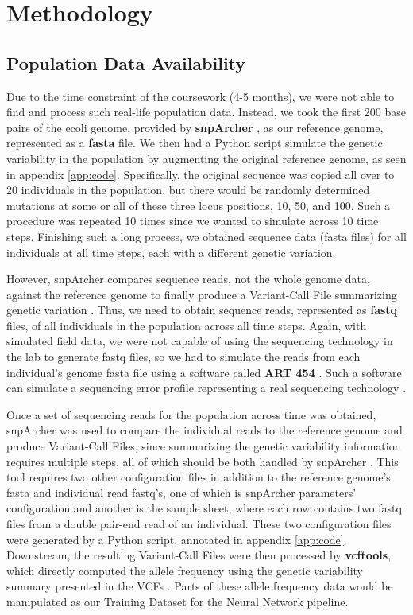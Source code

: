 \documentclass[12pt]{article}
\begin{document}
\section{Methodology}
\subsection{Population Data Availability}

Due to the time constraint of the coursework (4-5 months), we were not able to find and process such real-life population data. Instead, we took the first 200 base pairs of the ecoli genome, provided by \textbf{snpArcher} \cite{snparcher2024}, as our reference genome, represented as a \textbf{fasta} file. We then had a Python script simulate the genetic variability in the population by augmenting the original reference genome, as seen in appendix \ref{app:code}. Specifically, the original sequence was copied all over to 20 individuals in the population, but there would be randomly determined mutations at some or all of these three locus positions, 10, 50, and 100. Such a procedure was repeated 10 times since we wanted to simulate across 10 time steps. Finishing such a long process, we obtained sequence data (fasta files) for all individuals at all time steps, each with a different genetic variation.

However, snpArcher compares sequence reads, not the whole genome data, against the reference genome to finally produce a Variant-Call File summarizing genetic variation \cite{snparcher2024}. Thus, we need to obtain sequence reads, represented as \textbf{fastq} files, of all individuals in the population across all time steps. Again, with simulated field data, we were not capable of using the sequencing technology in the lab to generate fastq files, so we had to simulate the reads from each individual's genome fasta file using a software called \textbf{ART 454} \cite{art454_2012}. Such a software can simulate a sequencing error profile representing a real sequencing technology \cite{art454_2012}.

Once a set of sequencing reads for the population across time was obtained, snpArcher was used to compare the individual reads to the reference genome and produce Variant-Call Files, since summarizing the genetic variability information requires multiple steps, all of which should be both handled by snpArcher \cite{snparcher2024}. This tool requires two other configuration files in addition to the reference genome's fasta and individual read fastq's, one of which is snpArcher parameters' configuration and another is the sample sheet, where each row contains two fastq files from a double pair-end read of an individual. These two configuration files were generated by a Python script, annotated in appendix \ref{app:code}. Downstream, the resulting Variant-Call Files were then processed by \textbf{vcftools}, which directly computed the allele frequency using the genetic variability summary presented in the VCFs \cite{vcftools2011}. Parts of these allele frequency data would be manipulated as our Training Dataset for the Neural Network pipeline.
\end{document}
